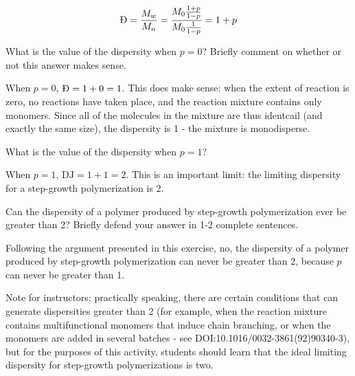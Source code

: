 \begin{activity}
\begin{ctqs}
			\begin{solution}[1.95in]
			
				\begin{equation*}
					\text{\DJ} = \frac{M_w}{M_n} = \frac{M_0\frac{1+p}{1-p}}{M_0\frac{1}{1-p}} = 1+p
				\end{equation*}
			\end{solution}
			
			
		\question What is the value of the dispersity when $p=0$?  Briefly comment on whether or not this answer makes sense.
		
			\begin{solution}[1.5in]
			
				When $p=0$, $\text{\DJ}=1+0 = 1$.  This does make sense: when the extent of reaction is zero, no reactions have taken place, and the reaction mixture contains only monomers.  Since all of the molecules in the mixture are thus identcail (and exactly the same size), the dispersity is 1 - the mixture is monodisperse.
			
			\end{solution}
			
			
		\question What is the value of the dispersity when $p=1$?
		
			\begin{solution}[1in]
			
				When $p=1$, $\text{DJ}=1+1=2$.  This is an important limit: the limiting dispersity for a step-growth polymerization is 2.
			
			\end{solution}
			
			
			
		\question Can the dispersity of a polymer produced by step-growth polymerization ever be greater than 2?  Briefly defend your answer in 1-2 complete sentences.
		
			\begin{solution}[1.5in]
			
				Following the argument presented in this exercise, no, the dispersity of a polymer produced by step-growth polymerization can never be greater than 2, because $p$ can never be greater than 1. 
				
				Note for instructors: practically speaking, there are certain conditions that can generate dispersities greater than 2 (for example, when the reaction mixture contains multifunctional monomers that induce chain branching, or when the monomers are added in several batches - see DOI:10.1016/0032-3861(92)90340-3), but for the purposes of this activity, students should learn that the ideal limiting dispersity for step-growth polymerizations is two.
			

\end{solution}
\end{ctqs}
\end{activity}

